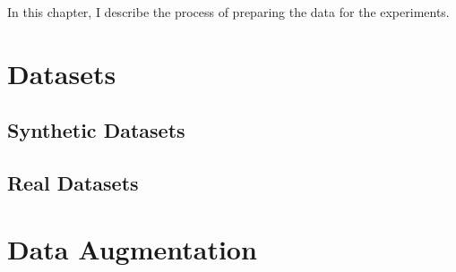 \label{chapter:data-preparation}

In this chapter, I describe the process of preparing the data for the experiments.

\section{Datasets}

\subsection{Synthetic Datasets}

\subsection{Real Datasets}


\section{Data Augmentation}